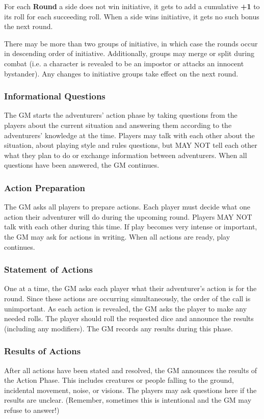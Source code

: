 \begin{multicols*}{2}
For each \textbf{Round} a side does not win initiative, it gets to add a cumulative \textbf{+1} to its roll for each succeeding roll. When a side wins initiative, it gets no such bonus the next round.

There may be more than two groups of initiative, in which case the rounds occur in descending order of initiative. Additionally, groups may merge or split during combat (i.e. a character is revealed to be an impostor or attacks an innocent bystander). Any changes to initiative groups take effect on the next round. 
\subsubsection{Informational Questions}
The GM starts the adventurers' action phase by taking questions from the players about the current situation and answering them according to the adventurers' knowledge at the time. Players may talk with each other about the situation, about playing style and rules questions, but MAY NOT tell each other what they plan to do or exchange information between adventurers. When all questions have been answered, the GM continues.
\subsubsection{Action Preparation}
The GM asks all players to prepare actions. Each player must decide what one action their adventurer will do during the upcoming round. Players MAY NOT talk with each other during this time. If play becomes very intense or important, the GM may ask for actions in writing. When all actions are ready, play continues.
\subsubsection{Statement of Actions}
One at a time, the GM asks each player what their adventurer's action is for the round. Since these actions are occurring simultaneously, the order of the call is unimportant. As each action is revealed, the GM asks the player to make any needed rolls. The player should roll the requested dice and announce the results (including any modifiers). The GM records any results during this phase.
\subsubsection{Results of Actions}
After all actions have been stated and resolved, the GM announces the results of the Action Phase. This includes creatures or people falling to the ground, incidental movement, noise, or visions. The players may ask questions here if the results are unclear. (Remember, sometimes this is intentional and the GM may refuse to answer!)

\end{multicols*}
